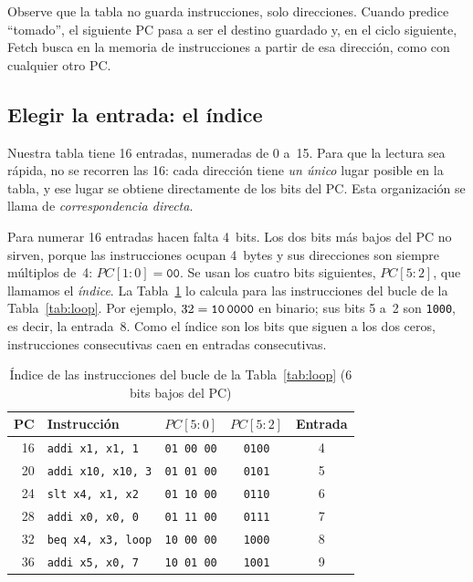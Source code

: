 \documentclass[11pt,a4paper]{article}
\newcommand{\sig}[1]{\textit{#1}}
\newcommand{\ins}[1]{\texttt{#1}}
\begin{document}
Observe que la tabla no guarda instrucciones, solo direcciones. Cuando predice ``tomado'',
el siguiente PC pasa a ser el destino guardado y, en el ciclo siguiente, Fetch busca en la
memoria de instrucciones a partir de esa dirección, como con cualquier otro PC.

\subsection{Elegir la entrada: el índice}

Nuestra tabla tiene 16 entradas, numeradas de 0 a~15. Para que la lectura sea rápida, no se
recorren las 16: cada dirección tiene \emph{un único} lugar posible en la tabla, y ese
lugar se obtiene directamente de los bits del PC. Esta organización se llama de
\emph{correspondencia directa}.

Para numerar 16 entradas hacen falta 4~bits. Los dos bits más bajos del PC no sirven,
porque las instrucciones ocupan 4~bytes y sus direcciones son siempre múltiplos de~4:
$\sig{PC}[1{:}0] = \texttt{00}$. Se usan los cuatro bits siguientes, $\sig{PC}[5{:}2]$, que
llamamos el \emph{índice}. La Tabla~\ref{tab:idx} lo calcula para las instrucciones del
bucle de la Tabla~\ref{tab:loop}. Por ejemplo, $32 = \texttt{10\,0000}$ en binario; sus
bits 5 a~2 son \texttt{1000}, es decir, la entrada~8. Como el índice son los bits que siguen
a los dos ceros, instrucciones consecutivas caen en entradas consecutivas.

\begin{table}[htbp]
\centering\small
\caption{Índice de las instrucciones del bucle de la Tabla~\ref{tab:loop} (6 bits bajos del
PC)}
\label{tab:idx}
\begin{tabular}{@{}rlccc@{}}
\toprule
PC & Instrucción & $\sig{PC}[5{:}0]$ & $\sig{PC}[5{:}2]$ & Entrada \\
\midrule
16 & \ins{addi x1, x1, 1}   & \texttt{01\,00\,00} & \texttt{0100} & 4 \\
20 & \ins{addi x10, x10, 3} & \texttt{01\,01\,00} & \texttt{0101} & 5 \\
24 & \ins{slt  x4, x1, x2}  & \texttt{01\,10\,00} & \texttt{0110} & 6 \\
28 & \ins{addi x0, x0, 0}   & \texttt{01\,11\,00} & \texttt{0111} & 7 \\
32 & \ins{beq  x4, x3, loop}& \texttt{10\,00\,00} & \texttt{1000} & 8 \\
36 & \ins{addi x5, x0, 7}   & \texttt{10\,01\,00} & \texttt{1001} & 9 \\
\bottomrule
\end{tabular}
\end{table}
\end{document}
